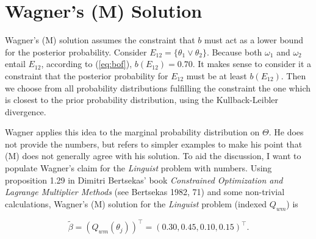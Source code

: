 \documentclass[11pt]{article}
\begin{document}
\section{Wagner's (M) Solution}
\label{WagnersMSolution}

Wagner's (M) solution assumes the constraint that $b$ must act as a
lower bound for the posterior probability. Consider
$E_{12}=\{\theta_{1}\vee\theta_{2}\}$. Because both $\omega_{1}$ and
$\omega_{2}$ entail $E_{12}$, according to (\ref{eq:bof}),
$b(E_{12})=0.70$. It makes sense to consider it a constraint that the
posterior probability for $E_{12}$ must be at least $b(E_{12})$. Then
we choose from all probability distributions fulfilling the constraint
the one which is closest to the prior probability distribution, using
the Kullback-Leibler divergence.

Wagner applies this idea to the marginal probability distribution on
$\Theta$. He does not provide the numbers, but refers to simpler
examples to make his point that (M) does not generally agree with his
solution. To aid the discussion, I want to populate Wagner's claim for
the \emph{Linguist} problem with numbers. Using proposition 1.29 in
Dimitri Bertsekas' book \emph{Constrained Optimization and Lagrange
  Multiplier Methods} (see Bertsekas 1982, 71) and some
non-trivial calculations, Wagner's (M) solution for the
\emph{Linguist} problem (indexed $Q_{wm}$) is

\begin{equation}
  \label{eq:p13}
  \tilde{\beta}=(Q_{wm}(\theta_{j}))^{\intercal}=(0.30,0.45,0.10,0.15)^{\intercal}.
\end{equation}

\end{document}
